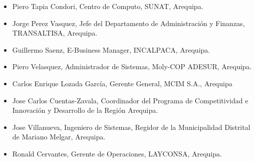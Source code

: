 \begin{itemize}
\item Piero Tapia Condori, Centro de Computo, SUNAT, Arequipa.
\item Jorge Perez Vasquez, Jefe del Departamento de Administración y Finanzas, TRANSALTISA, Arequipa.
\item Guillermo Saenz, E-Business Manager, INCALPACA, Arequipa.
\item Piero Velasquez, Administrador de Sistemas, Moly-COP ADESUR, Arequipa.
\item Carlos Enrique Lozada Garcí­a, Gerente General, MCIM S.A., Arequipa
\item Jose Carlos Cuentas-Zavala, Coordinador del Programa de Competitividad e Innovación y Desarrollo de la Región Arequipa.
\item Jose Villanueva, Ingeniero de Sistemas, Regidor de la Municipalidad Distrital de Mariano Melgar, Arequipa.
\item Ronald Cervantes, Gerente de Operaciones, LAYCONSA, Arequipa.
\end{itemize}
